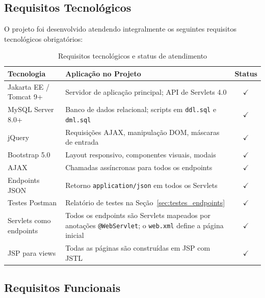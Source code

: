 \subsection{Requisitos Tecnológicos}

O projeto foi desenvolvido atendendo integralmente os seguintes requisitos tecnológicos obrigatórios:

\begin{table}[h!]
	\centering
	\caption{Requisitos tecnológicos e status de atendimento}
	\label{tab:req_tec}
	\begin{tabular}{|p{4.5cm}|p{9.5cm}|c|}
		\hline
		\textbf{Tecnologia} & \textbf{Aplicação no Projeto} & \textbf{Status} \\ \hline
		Jakarta EE / Tomcat 9+ & Servidor de aplicação principal; API de Servlets 4.0 & $\checkmark$ \\ \hline
		MySQL Server 8.0+ & Banco de dados relacional; scripts em \texttt{ddl.sql} e \texttt{dml.sql} & $\checkmark$ \\ \hline
		jQuery & Requisições AJAX, manipulação DOM, máscaras de entrada & $\checkmark$ \\ \hline
		Bootstrap 5.0 & Layout responsivo, componentes visuais, modais & $\checkmark$ \\ \hline
		AJAX & Chamadas assíncronas para todos os endpoints & $\checkmark$ \\ \hline
		Endpoints JSON & Retorno \texttt{application/json} em todos os Servlets & $\checkmark$ \\ \hline
		Testes Postman & Relatório de testes na Seção~\ref{sec:testes_endpoints} & $\checkmark$ \\ \hline
		Servlets como endpoints & Todos os endpoints são Servlets mapeados por anotações \texttt{@WebServlet}; o \texttt{web.xml} define a página inicial & $\checkmark$ \\ \hline
		JSP para views & Todas as páginas são construídas em JSP com JSTL & $\checkmark$ \\ \hline
	\end{tabular}
\end{table}

\subsection{Requisitos Funcionais}

